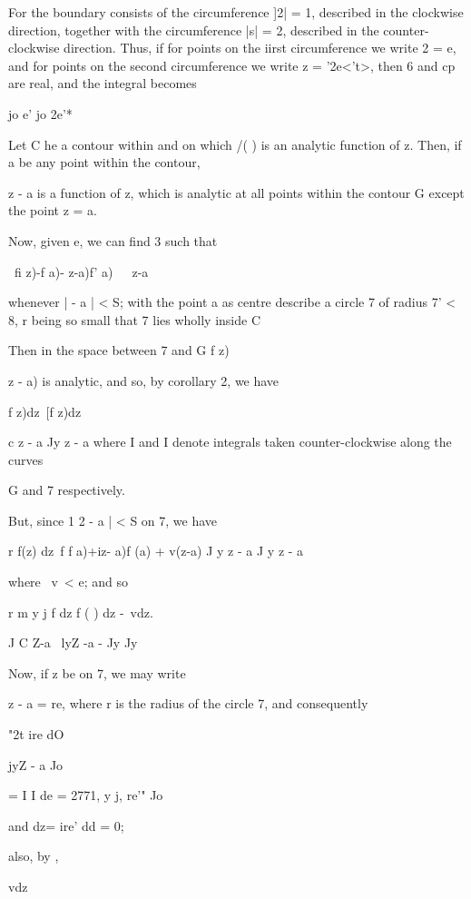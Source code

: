 {%
%

For the boundary consists of the circumference ]2| = 1, described in
the clockwise direction, together with the circumference |s| = 2,
described in the counter-clockwise direction. Thus, if for points on
the iirst circumference we write 2 = e, and for points on the second
circumference we write z = '2e<'t>, then 6 and cp are real, and the
integral becomes

jo e' jo 2e'*


Let C he a contour within and on which /( ) is an analytic function of
z. Then, if a be any point within the contour,

z - a is a function of z, which is analytic at all points within the
contour G except the point z = a.

Now, given e, we can find 3 such that

\ fi z)-f a)- z-a)f' a)\ \ \ z-a\

whenever | - a | < S; with the point a as centre describe a circle 7
of radius 7' < 8, r being so small that 7 lies wholly inside C

Then in the space between 7 and G f z)\ \ {z - a) is analytic, and so,
by  corollary 2, we have

f z)dz\ [f z)dz

c z - a Jy z - a where I and I denote integrals taken
counter-clockwise along the curves

G and 7 respectively.

But, since 1 2 - a | < S on 7, we have

r f(z) dz\ f f a)+iz- a)f (a) + v(z-a) J y z - a J y z - a

where \ v\ < e; and so

r m y j f dz f ( ) dz -\ vdz.

J C Z-a \ lyZ -a - Jy Jy

Now, if z be on 7, we may write

z - a = re, where r is the radius of the circle 7, and consequently

"2t ire dO

jyZ - a Jo

= I I de = 2771, y j, re'" Jo

and dz= ire' dd = 0;

also, by ,

vdz

}}
